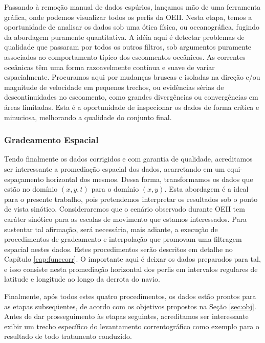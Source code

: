 Passando à remoção manual de dados espúrios, lançamos mão de uma ferramenta gráfica, onde podemos 
visualizar todos os perfis da OEII. Nesta etapa, temos a oportunidade
de analisar os dados sob uma ótica física, ou oceanográfica, fugindo da abordagem puramente quantitativa.
A idéia aqui é detectar problemas de qualidade que passaram por todos os outros filtros, sob argumentos puramente 
associados ao comportamento típico dos escoamentos oceânicos. As correntes oceânicas têm uma forma razoavelmente 
contínua e suave de variar espacialmente. Procuramos aqui por mudanças bruscas e isoladas na direção e/ou
magnitude de velocidade em pequenos trechos, ou evidências sérias de descontinuidades no escoamento, como
grandes divergências ou convergências em áreas limitadas. Esta é a oportunidade de inspecionar os dados de forma 
crítica e minuciosa, melhorando a qualidade do conjunto final.


\subsubsection{Gradeamento Espacial}\label{sec:grid}

\hspace{6mm} Tendo finalmente os dados corrigidos e com garantia de qualidade, acreditamos ser 
interessante a promediação espacial dos dados, acarretando em um equi-espaçamento horizontal dos mesmos. 
Dessa forma, transformamos os dados que estão no domínio {\bf $(x,y,t)$} para o domínio {\bf $(x,y)$}. Esta 
abordagem é a ideal para o presente trabalho, pois pretendemos interpretar os resultados sob o ponto de 
vista sinótico. Consideraremos que o cenário observado durante OEII tem caráter sinótico
para as escalas de movimento que estamos interessados. Para sustentar tal afirmação, será necessária, 
mais adiante, a execução de procedimentos de gradeamento e interpolação que promovam uma filtragem 
espacial nestes dados. Estes procedimentos serão descritos em detalhe no Capítulo \ref{cap:funccorr}. O importante
aqui é deixar os dados preparados para tal, e isso consiste nesta promediação horizontal dos perfis em 
intervalos regulares de latitude e longitude ao longo da derrota do navio. 

Finalmente, após todos estes quatro procedimentos, os dados estão prontos para as etapas subseq\"uentes, de 
acordo com os objetivos propostos na Seção \ref{sec:obj}. Antes de
dar prosseguimento às etapas seguintes, acreditamos ser interessante exibir um trecho específico do levantamento
correntográfico como exemplo para o resultado de todo tratamento conduzido. 

